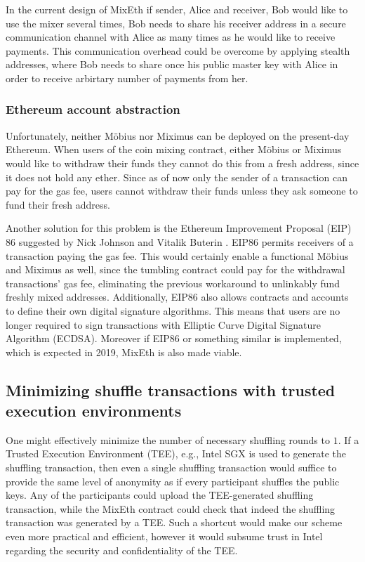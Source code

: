 \documentclass[a4paper,UKenglish,cleveref, autoref]{oasics-v2019}
\begin{document}
\begin{appendices}
In the current design of MixEth if sender, Alice and receiver, Bob would like to use the mixer several times, Bob needs to share his receiver address in a secure communication channel with Alice as many times as he would like to receive payments. This communication overhead could be overcome by applying stealth addresses, where Bob needs to share once his public master key with Alice in order to receive arbirtary number of payments from her.

\subsubsection{Ethereum account abstraction}
Unfortunately, neither Möbius nor Miximus can be deployed on the present-day Ethereum. When users of the coin mixing contract, either Möbius or Miximus would like to withdraw their funds they cannot do this from a fresh address, since it does not hold any ether. Since as of now only the sender of a transaction can pay for the gas fee, users cannot withdraw their funds unless they ask someone to fund their fresh address.     

Another solution for this problem is the Ethereum Improvement Proposal (EIP) 86 suggested by Nick Johnson and Vitalik Buterin \cite{buterin2017accounteip}. EIP86 permits receivers of a transaction paying the gas fee. This would certainly enable a functional Möbius and Miximus as well, since the tumbling contract could pay for the withdrawal transactions' gas fee, eliminating the previous workaround to unlinkably fund freshly mixed addresses. Additionally, EIP86 also allows contracts and accounts to define their own digital signature algorithms. This means that users are no longer required to sign transactions with Elliptic Curve Digital Signature Algorithm (ECDSA). Moreover if EIP86 or something similar is implemented, which is expected in 2019, MixEth is also made viable.

\subsection{Minimizing shuffle transactions with trusted execution environments}
One might effectively minimize the number of necessary shuffling rounds to $1$. If a Trusted Execution Environment (TEE), e.g., Intel SGX is used to generate the shuffling transaction, then even a single shuffling transaction would suffice to provide the same level of anonymity as if every participant shuffles the public keys. Any of the participants could upload the TEE-generated shuffling transaction, while the MixEth contract could check that indeed the shuffling transaction was generated by a TEE. Such a shortcut would make our scheme even more practical and efficient, however it would subsume trust in Intel regarding the security and confidentiality of the TEE.      
	
\end{appendices}
\end{document}

